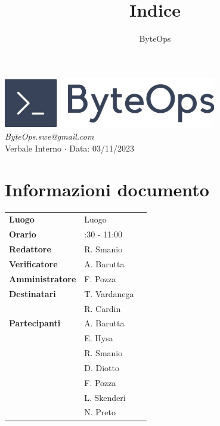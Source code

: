 \documentclass{article}
\title{\textbf{\fontsize{28}{6}\selectfont Indice}}
\author{\fontsize{14}{6}\selectfont ByteOps}
\begin{document}
\pagestyle{fancy}
\begin{center}
\includegraphics[width = 0.7\textwidth]{../../../Images/logo.png} \\
\vspace{0.2cm}
\textcolor[RGB]{60, 60, 60}{\textit{ByteOps.swe@gmail.com}} \\
\vspace{1cm}
\fontsize{16}{6}\selectfont Verbale Interno $\cdot$ Data: 03/11/2023 \\
\vspace{0.5cm}
\end{center}

\section*{Informazioni documento}
\def\arraystretch{1.2}
\begin{tabular}{>{\raggedleft\arraybackslash}p{}|>{\raggedright\arraybackslash}p{}c}
\hline
\addlinespace
\textbf{Luogo} & Luogo \vspace{10pt} \\
\textbf{Orario} & 9:30 - 11:00 \vspace{10pt} \\
\textbf{Redattore} & R. Smanio \vspace{10pt} \\
\textbf{Verificatore} & A. Barutta \vspace{10pt} \\
\textbf{Amministratore} & F. Pozza \vspace{10pt} \\
\textbf{Destinatari} & T. Vardanega \\ & R. Cardin \vspace{10pt} \\
\textbf{Partecipanti} & A. Barutta \\ & E. Hysa \\ & R. Smanio \\ & D. Diotto \\ & F. Pozza \\ & L. Skenderi \\ & N. Preto \vspace{10pt} \\
\end{tabular}
\pagebreak 
\end{document}
